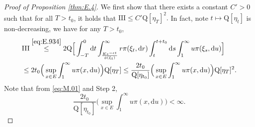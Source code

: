 \documentclass[12pt,a4paper]{amsart}
\numberwithin{equation}{section}
\theoremstyle{plain}
\theoremstyle{definition}
\theoremstyle{remark}
\begin{document}
\begin{proof}[Proof of Proposition \ref{thm:E.4}]
 We first show that
	there exists a constant $C'>0$ such that for all $T>t_0$, it holds that
$
	\text{III} \leq C' \mathrm Q[\eta_T]^2.
$
	In fact, note $t\mapsto \mathrm Q[\eta_t]$ is non-decreasing, we have for any $T > t_0$,
\begin{align}
	&\text{III}
	\overset{\eqref{eq:E.934}}\leq 2\mathrm Q\Big[\int_{-T}^0\mathrm dt\int_{\frac{Ke^{-\epsilon t}}{\phi(\xi_t)}}^\infty r \pi(\xi_t, \mathrm dr)\int_t^{t+t_0}\mathrm ds\int_{1}^\infty u \pi(\xi_s,\mathrm du) \Big]
	\\&\leq 2 t_0 \Big( \sup_{x\in E} \int_{1}^\infty u \pi(x,\mathrm du)\Big) \mathrm Q[\eta_T]
	\leq \frac{2 t_0}{\mathrm Q[\eta_{t_0}]} \Big( \sup_{x\in E} \int_{1}^\infty u \pi(x,\mathrm du)\Big) \mathrm Q[\eta_T]^2.
\end{align}
	Note that from \eqref{eq:M.01} and Step 2,
\[
	\frac{2 t_0}{\mathrm Q[\eta_{t_0}]} \Big( \sup_{x\in E} \int_{1}^\infty u \pi(x,\mathrm du)\Big) < \infty.
\]


\end{proof}
\end{document}
